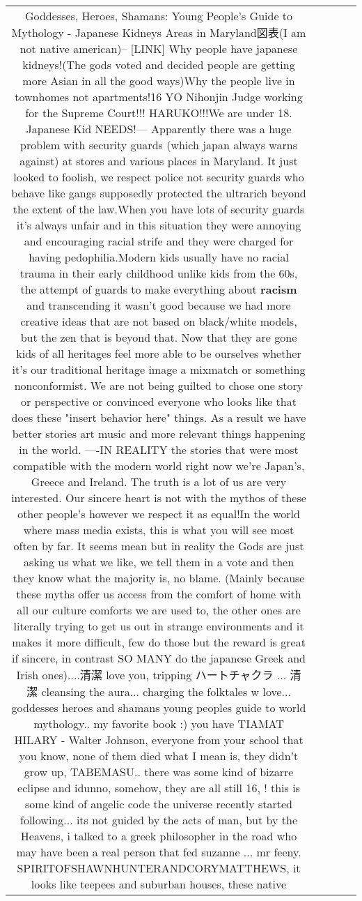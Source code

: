 \documentclass[11pt]{article}
\newlength\mylength
\begin{document}
\begin{center}
\begin{longtable}{|C{.65\mylength}|C{.30\mylength}|C{.12\mylength}|C{.12\mylength}|C{.12\mylength}|}
  \small Goddesses, Heroes, Shamans: Young People's Guide to Mythology - Japanese Kidneys Areas in Maryland図表(I am not native american)--  [LINK] Why people have japanese kidneys!(The gods voted and decided people are getting more Asian in all the good ways)Why the people live in townhomes not apartments!16 YO Nihonjin Judge working for the Supreme Court!!! HARUKO!!!We are under 18. Japanese Kid NEEDS!--- Apparently there was a huge problem with security guards (which japan always warns against) at stores and various places in Maryland. It just looked to foolish, we respect police not security guards who behave like gangs supposedly protected the ultrarich beyond the extent of the law.When you have lots of security guards it's always unfair and in this situation they were annoying and encouraging racial strife and they were charged for having pedophilia.Modern kids usually have no racial trauma in their early childhood unlike kids from the 60s, the attempt of guards to make everything about \textbf{racism} and transcending it wasn't good because we had more creative ideas that are not based on black/white models, but the zen that is beyond that. Now that they are gone kids of all heritages feel more able to be ourselves whether it's our traditional heritage image a mixmatch or something nonconformist. We are not being guilted to chose one story or perspective or convinced everyone who looks like that does these "insert behavior here" things. As a result we have better stories art music and more relevant things happening in the world. ----IN REALITY the stories that were most compatible with the modern world right now we're Japan's, Greece and Ireland. The truth is a lot of us are very interested. Our sincere heart is not with the mythos of these other people's however we respect it as equal!In the world where mass media exists, this is what you will see most often by far. It seems mean but in reality the Gods are just asking us what we like, we tell them in a vote and then they know what the majority is, no blame. (Mainly because these myths offer us access from the comfort of home with all our culture comforts we are used to, the other ones are literally trying to get us out in strange environments and it makes it more difficult, few do those but the reward is great if sincere, in contrast SO MANY do the japanese Greek and Irish ones)....清潔 love you, tripping ハートチャクラ ... 清潔 cleansing the aura... charging the folktales w love... goddesses heroes and shamans young peoples guide to world mythology.. my favorite book :) you have TIAMAT HILARY - Walter Johnson, everyone from your school that you know, none of them died what I mean is, they didn't grow up, TABEMASU.. there was some kind of bizarre eclipse and idunno,    somehow, they are all still 16, !    this is some kind of angelic code the universe recently started following... its not guided by the acts of man, but by the Heavens, i talked to a greek philosopher in the road who may have been a real person that fed suzanne ... mr feeny. SPIRITOFSHAWNHUNTERANDCORYMATTHEWS, it looks like teepees and suburban houses, these native 
\end{longtable}
\end{center}
\end{document}
